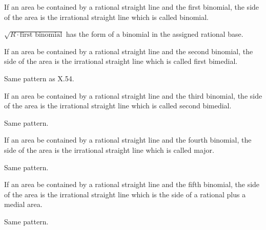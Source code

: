 \documentclass{rrxiv}
\begin{document}
\begin{claim}
\label{prop:X.54}
If an area be contained by a rational straight line and the first
binomial, the side of the area is the irrational straight line which
is called binomial.
\end{claim}
\begin{evidence}[Proof of X.54]
\label{ev:X.54}
$\sqrt{R \cdot \text{first binomial}}$ has the form of a binomial in
the assigned rational base.
\end{evidence}

\begin{claim}
\label{prop:X.55}
If an area be contained by a rational straight line and the second
binomial, the side of the area is the irrational straight line which
is called first bimedial.
\end{claim}
\begin{evidence}[Proof of X.55]
\label{ev:X.55}
Same pattern as X.54.
\end{evidence}

\begin{claim}
\label{prop:X.56}
If an area be contained by a rational straight line and the third
binomial, the side of the area is the irrational straight line which
is called second bimedial.
\end{claim}
\begin{evidence}[Proof of X.56]
\label{ev:X.56}
Same pattern.
\end{evidence}

\begin{claim}
\label{prop:X.57}
If an area be contained by a rational straight line and the fourth
binomial, the side of the area is the irrational straight line which
is called major.
\end{claim}
\begin{evidence}[Proof of X.57]
\label{ev:X.57}
Same pattern.
\end{evidence}

\begin{claim}
\label{prop:X.58}
If an area be contained by a rational straight line and the fifth
binomial, the side of the area is the irrational straight line which
is the side of a rational plus a medial area.
\end{claim}
\begin{evidence}[Proof of X.58]
\label{ev:X.58}
Same pattern.
\end{evidence}
\end{document}
